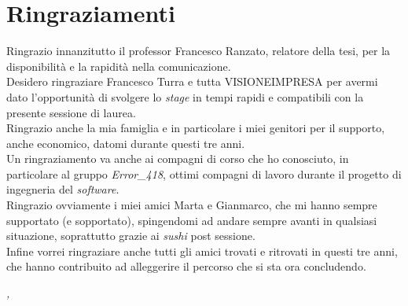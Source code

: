 \cleardoublepage
{}
{}

\bigskip

\begingroup
\let\clearpage\relax
\let\cleardoublepage\relax
\let\cleardoublepage\relax

\chapter*{Ringraziamenti}

Ringrazio innanzitutto il professor Francesco Ranzato, relatore della tesi, per la disponibilità e la rapidità nella comunicazione.\\

\noindent Desidero ringraziare Francesco Turra e tutta VISIONEIMPRESA per avermi dato l'opportunità di svolgere lo \textit{stage} in tempi rapidi e compatibili con la presente sessione di laurea.\\

\noindent Ringrazio anche la mia famiglia e in particolare i miei genitori per il supporto, anche economico, datomi durante questi tre anni.\\

\noindent Un ringraziamento va anche ai compagni di corso che ho conosciuto, in particolare al gruppo \textit{Error\_418}, ottimi compagni di lavoro durante il progetto di ingegneria del \textit{software}.\\

\noindent Ringrazio ovviamente i miei amici Marta e Gianmarco, che mi hanno sempre supportato (e sopportato), spingendomi ad andare sempre avanti in qualsiasi situazione, soprattutto grazie ai \textit{sushi} post sessione.\\

\noindent Infine vorrei ringraziare anche tutti gli amici trovati e ritrovati in questi tre anni, che hanno contribuito ad alleggerire il percorso che si sta ora concludendo.\\

\bigskip

\noindent\textit{\myLocation, \myTime}
\hfill \myName

\endgroup
